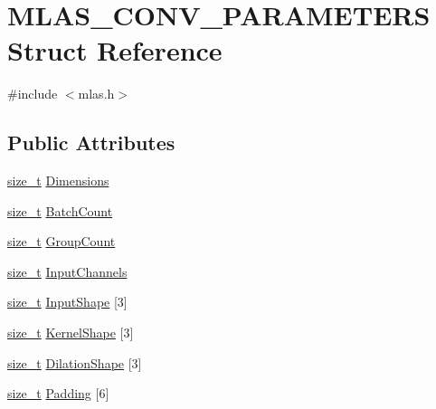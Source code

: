 \hypertarget{structMLAS__CONV__PARAMETERS}{}\section{M\+L\+A\+S\+\_\+\+C\+O\+N\+V\+\_\+\+P\+A\+R\+A\+M\+E\+T\+E\+RS Struct Reference}
\label{structMLAS__CONV__PARAMETERS}


{\ttfamily \#include $<$mlas.\+h$>$}

\subsection*{Public Attributes}
\begin{DoxyCompactItemize}
\item 
\mbox{\hyperlink{mlasi_8h_a503efbc1c6e50825320ad909366b78ab}{size\+\_\+t}} \mbox{\hyperlink{structMLAS__CONV__PARAMETERS_adda1854a0e3049ff00e890ed4b9dace8}{Dimensions}}
\item 
\mbox{\hyperlink{mlasi_8h_a503efbc1c6e50825320ad909366b78ab}{size\+\_\+t}} \mbox{\hyperlink{structMLAS__CONV__PARAMETERS_a81f5a9ae2f21920aaabf8e92b7e9f16a}{Batch\+Count}}
\item 
\mbox{\hyperlink{mlasi_8h_a503efbc1c6e50825320ad909366b78ab}{size\+\_\+t}} \mbox{\hyperlink{structMLAS__CONV__PARAMETERS_abb3e027a32609cde5324585a4597a1ab}{Group\+Count}}
\item 
\mbox{\hyperlink{mlasi_8h_a503efbc1c6e50825320ad909366b78ab}{size\+\_\+t}} \mbox{\hyperlink{structMLAS__CONV__PARAMETERS_a2c8c3c4a1a7ea9838592913aaa1da9bc}{Input\+Channels}}
\item 
\mbox{\hyperlink{mlasi_8h_a503efbc1c6e50825320ad909366b78ab}{size\+\_\+t}} \mbox{\hyperlink{structMLAS__CONV__PARAMETERS_a33d27cf5487488be06c0e2e3db7ac0a5}{Input\+Shape}} \mbox{[}3\mbox{]}
\item 
\mbox{\hyperlink{mlasi_8h_a503efbc1c6e50825320ad909366b78ab}{size\+\_\+t}} \mbox{\hyperlink{structMLAS__CONV__PARAMETERS_a390abf6662f61c4ba5e884b98542e8f0}{Kernel\+Shape}} \mbox{[}3\mbox{]}
\item 
\mbox{\hyperlink{mlasi_8h_a503efbc1c6e50825320ad909366b78ab}{size\+\_\+t}} \mbox{\hyperlink{structMLAS__CONV__PARAMETERS_a6eff8d568bbb9394b6b12bac7affe640}{Dilation\+Shape}} \mbox{[}3\mbox{]}
\item 
\mbox{\hyperlink{mlasi_8h_a503efbc1c6e50825320ad909366b78ab}{size\+\_\+t}} \mbox{\hyperlink{structMLAS__CONV__PARAMETERS_af87e4c24af74822ef22aa36659fb1b69}{Padding}} \mbox{[}6\mbox{]}

\end{DoxyCompactItemize}
